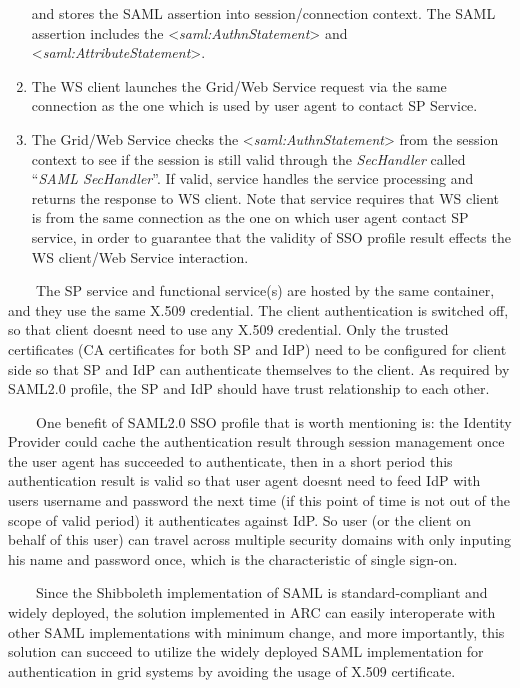 \documentclass{article}
\begin{document}
\begin{enumerate}
and stores the SAML assertion into session/connection context. The SAML
assertion includes the
{\textless}\textit{saml:AuthnStatement}{\textgreater} and
{\textless}\textit{saml:AttributeStatement}{\textgreater}.
\item The WS client launches the Grid/Web Service request via the same
connection as the one which is used by user agent to contact SP
Service.
\item The Grid/Web Service checks the
{\textless}\textit{saml:AuthnStatement}{\textgreater} from the session
context to see if the session is still valid through the
\textit{SecHandler} called {\textquotedblleft}\textit{SAML
SecHandler}{\textquotedblright}. If valid, service handles the service
processing and returns the response to WS client. Note that service
requires that WS client is from the same connection as the one on which
user agent contact SP service, in order to guarantee that the validity
of SSO profile result effects the WS client/Web Service interaction.
\end{enumerate}
\ \ \ \ The SP service and functional service(s) are hosted by the same
container, and they use the same X.509 credential. The client
authentication is switched off, so that client doesn{\textquotesingle}t
need to use any X.509 credential. Only the trusted certificates (CA
certificates for both SP and IdP) need to be configured for client side
so that SP and IdP can authenticate themselves to the client. As
required by SAML2.0 profile, the SP and IdP should have trust
relationship to each other.

\ \ \ \ One benefit of SAML2.0 SSO profile that is worth mentioning is:
the Identity Provider could cache the authentication result through
session management once the user agent has succeeded to authenticate,
then in a short period this authentication result is valid so that user
agent doesn{\textquotesingle}t need to feed IdP with
user{\textquotesingle}s username and password the next time (if this
point of time is not out of the scope of valid period) it authenticates
against IdP. So user (or the client on behalf of this user) can travel
across multiple security domains with only inputing his name and
password once, which is the characteristic of single sign-on.

\ \ \ \ Since the Shibboleth implementation of SAML is
standard-compliant and widely deployed, the solution implemented in ARC
can easily interoperate with other SAML implementations with minimum
change, and more importantly, this solution can succeed to utilize the
widely deployed SAML implementation for authentication in grid systems
by avoiding the usage of X.509 certificate.
\end{document}
